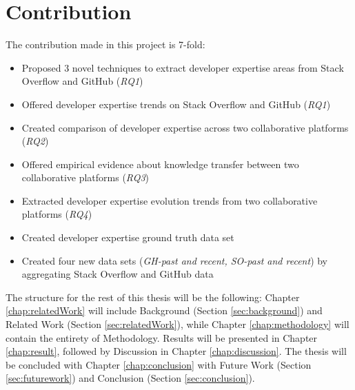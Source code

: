     \section{Contribution\label{sec:contribution}}
        The contribution made in this project is 7-fold:
        \begin{itemize}
            \item Proposed 3 novel techniques to extract developer expertise areas from Stack Overflow and GitHub (\emph{RQ1})
            \item Offered developer expertise trends on Stack Overflow and GitHub (\emph{RQ1})
            \item Created comparison of developer expertise across two collaborative platforms (\emph{RQ2})
            \item Offered empirical evidence about knowledge transfer between two collaborative platforms (\emph{RQ3})
            \item Extracted developer expertise evolution trends from two collaborative platforms (\emph{RQ4})
            \item Created developer expertise ground truth data set
            \item Created four new data sets (\emph{GH-past and recent, SO-past and recent}) by aggregating Stack Overflow and GitHub data
        \end{itemize}
    
        The structure for the rest of this thesis will be the following: Chapter \ref{chap:relatedWork} will include Background (Section \ref{sec:background}) and Related Work (Section \ref{sec:relatedWork}), while Chapter \ref{chap:methodology} will contain the entirety of Methodology. Results will be presented in Chapter \ref{chap:result}, followed by Discussion in Chapter \ref{chap:discussion}. The thesis will be concluded with Chapter \ref{chap:conclusion} with Future Work (Section \ref{sec:futurework}) and Conclusion (Section \ref{sec:conclusion}).
        
